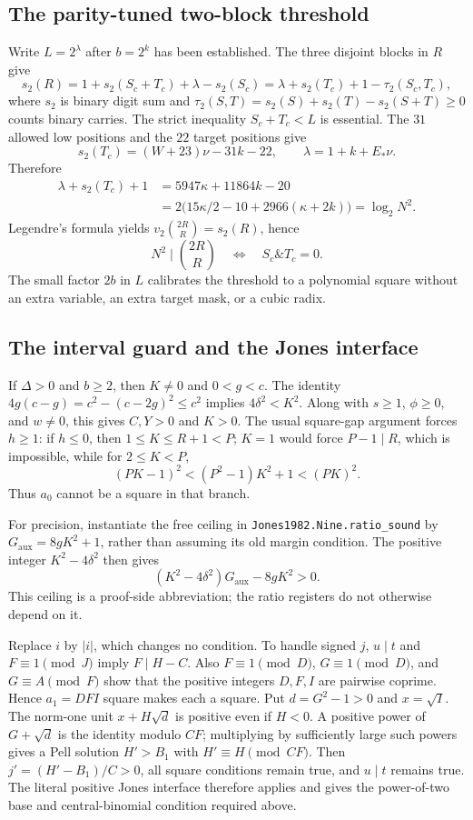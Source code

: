 \subsection{The parity-tuned two-block threshold}
Write $L=2^\lambda$ after $b=2^k$ has been established. The three disjoint
blocks in $R$ give
\[
 s_2(R)=1+s_2(S_c+T_c)+\lambda-s_2(S_c)
       =\lambda+s_2(T_c)+1-\tau_2(S_c,T_c),
\]
where $s_2$ is binary digit sum and
$\tau_2(S,T)=s_2(S)+s_2(T)-s_2(S+T)\ge0$ counts binary carries.
The strict inequality $S_c+T_c<L$ is essential.
The $31$ allowed low positions and the $22$ target positions give
\[
 s_2(T_c)=(W+23)\nu-31k-22,\qquad
 \lambda=1+k+E_*\nu.
\]
Therefore
\begin{align*}
 \lambda+s_2(T_c)+1
 &=5947\kappa+11864k-20\\
 &=2\bigl(15\kappa/2-10+2966(\kappa+2k)\bigr)
 =\log_2N^2.
\end{align*}
Legendre's formula yields
$v_2\binom{2R}{R}=s_2(R)$, hence
\[
 N^2\mid\binom{2R}{R}
 \quad\Longleftrightarrow\quad S_c\mathbin{\&}T_c=0.
\]
The small factor $2b$ in $L$ calibrates the threshold to a polynomial square
without an extra variable, an extra target mask, or a cubic radix.

\subsection{The interval guard and the Jones interface}
If $\Delta>0$ and $b\ge2$, then $K\ne0$ and
$0<g<c$. The identity $4g(c-g)=c^2-(c-2g)^2\le c^2$ implies
$4\delta^2<K^2$. Along with $s\ge1$, $\phi\ge0$, and $w\ne0$, this gives
$C,Y>0$ and $K>0$. The usual square-gap argument forces $h\ge1$:
if $h\le0$, then $1\le K\le R+1<P$; $K=1$ would force $P-1\mid R$,
which is impossible, while for $2\le K<P$,
\[
 (PK-1)^2<(P^2-1)K^2+1<(PK)^2.
\]
Thus $a_0$ cannot be a square in that branch.

For precision, instantiate the free ceiling in
\texttt{Jones1982.Nine.ratio\_sound} by
$G_{\mathrm{aux}}=8gK^2+1$, rather than assuming its old margin condition.
The positive integer $K^2-4\delta^2$ then gives
\[
 (K^2-4\delta^2)G_{\mathrm{aux}}-8gK^2>0.
\]
This ceiling is a proof-side abbreviation; the ratio registers do not
otherwise depend on it.

Replace $i$ by $|i|$, which changes no condition. To handle signed $j$,
$u\mid t$ and $F\equiv1\pmod J$ imply $F\mid H-C$. Also
$F\equiv1\pmod D$, $G\equiv1\pmod D$, and $G\equiv A\pmod F$ show
that the positive integers $D,F,I$ are pairwise coprime.
Hence $a_1=DFI$ square makes each a square. Put $d=G^2-1>0$ and
$x=\sqrt I$. The norm-one unit $x+H\sqrt d$ is positive even if $H<0$.
A positive power of $G+\sqrt d$ is the identity modulo $CF$; multiplying by
sufficiently large such powers gives a Pell solution $H'>B_1$ with
$H'\equiv H\pmod{CF}$. Then $j'=(H'-B_1)/C>0$, all square conditions
remain true, and $u\mid t$ remains true. The literal positive Jones interface
therefore applies and gives the power-of-two base and central-binomial
condition required above.

